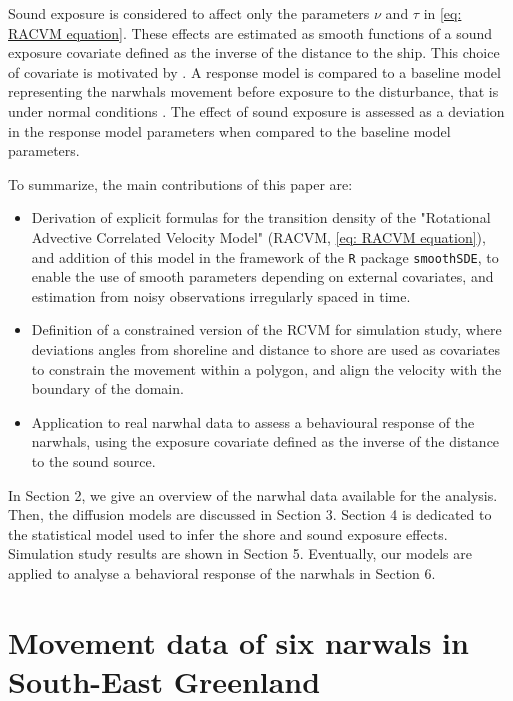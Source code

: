 \documentclass[11pt]{article}
\newcommand {\1}{\mathbb{1}}
\theoremstyle{definition}
\theoremstyle{remark}
\theoremstyle{remark}
\begin{document}
Sound exposure is considered to affect only the parameters $\nu$ and $\tau$ in \eqref{eq: RACVM equation}. These effects are estimated as smooth functions of a sound exposure covariate defined as the inverse of the distance to the ship. This choice of covariate is motivated by \cite{heide-jorgensen_behavioral_2021}. A response model is compared to a baseline model representing the narwhals movement before exposure to the disturbance, that is under normal conditions \cite{michelot_continuous-time_2022}.
The effect of sound exposure is assessed as a deviation in the response model parameters when compared to the baseline model parameters.



To summarize, the main contributions of this paper are:
\begin{itemize}
	\item Derivation of explicit formulas for the transition density of the "Rotational Advective Correlated Velocity Model" (RACVM, \eqref{eq: RACVM equation}), and addition of this model in the framework of  the \texttt{R} package \texttt{smoothSDE}, to enable the use of smooth parameters depending on external covariates, and estimation from noisy observations irregularly spaced in time.
	\item Definition of a constrained version of the RCVM for simulation study, where deviations angles from shoreline and distance to shore are used as covariates to constrain the movement within a polygon, and align the velocity with the boundary of the domain.
	\item Application to real narwhal data to assess a behavioural response of the narwhals, using the exposure covariate defined as the inverse of the distance to the sound source.
\end{itemize}

In Section 2, we give an overview of the narwhal data available for the analysis.
Then, the diffusion models are discussed in Section 3. Section 4 is dedicated to the statistical model used to infer the shore and sound exposure effects. Simulation study results are shown in Section 5. Eventually, our models are applied to analyse a behavioral response of the narwhals in Section 6.





\section{Movement data of six narwals in South-East Greenland}
\end{document}
